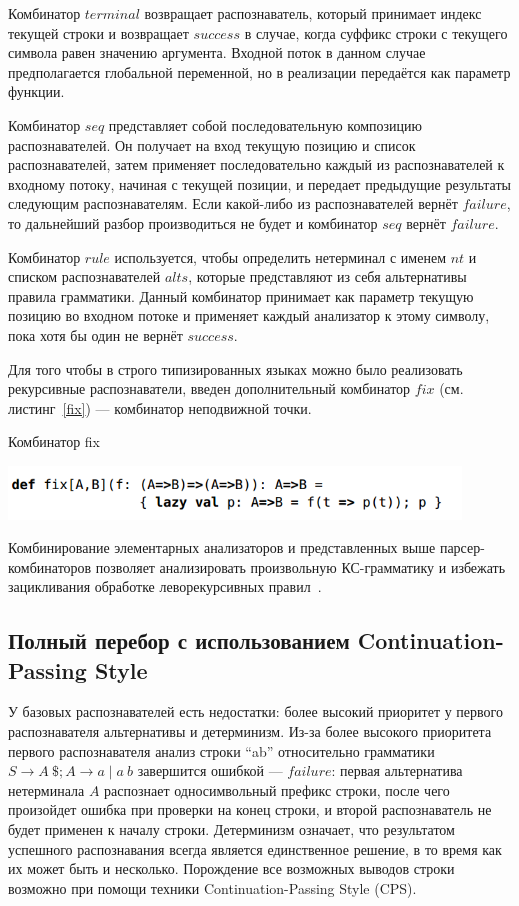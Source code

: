 Комбинатор $terminal$ возвращает распознаватель, который принимает индекс текущей строки и возвращает $success$ в случае, когда суффикс строки с текущего символа равен значению аргумента. Входной поток в данном случае предполагается глобальной переменной, но в реализации передаётся как параметр функции. 

Комбинатор $seq$ представляет собой последовательную композицию распознавателей. Он получает на вход текущую позицию и список распознавателей, затем применяет последовательно каждый из распознавателей к входному потоку, начиная с текущей позиции, и передает предыдущие результаты следующим распознавателям. Если какой-либо из распознавателей вернёт $failure$, то дальнейший разбор производиться не будет и комбинатор $seq$ вернёт $failure$. 

 Комбинатор $rule$ используется, чтобы определить нетерминал с именем $nt$ и списком распознавателей $alts$, которые представляют из себя альтернативы правила грамматики. Данный комбинатор принимает как параметр текущую позицию во входном потоке и применяет каждый анализатор к этому символу, пока хотя бы один не вернёт $success$. 

Для того чтобы в строго типизированных языках можно было реализовать рекурсивные распознаватели, введен дополнительный комбинатор $fix$ (см. листинг~\ref{fix}) --- комбинатор неподвижной точки.

\begin{listing}
\caption{Комбинатор fix}
\label{fix}
\centering
\includegraphics[width=0.9\textwidth]{Smolina/pics/fix.png}
\end{listing} 

Комбинирование элементарных анализаторов и представленных выше парсер-комбинаторов позволяет анализировать произвольную КС-грамматику и избежать зацикливания обработке леворекурсивных правил~\cite{GLL}.

\subsection{Полный перебор с использованием Continuation-Passing Style}
У базовых распознавателей есть недостатки: более высокий приоритет у первого распознавателя альтернативы и детерминизм. Из-за более высокого приоритета первого распознавателя анализ строки ``ab'' относительно грамматики $S \rightarrow A \ \$; A \rightarrow a \mid a \ b$ завершится ошибкой --- $failure$: первая альтернатива нетерминала $A$ распознает односимвольный префикс строки, после чего произойдет ошибка при проверки на конец строки, и второй распознаватель не будет применен к началу строки. Детерминизм означает, что результатом успешного распознавания всегда является единственное решение, в то время как их может быть и несколько. Порождение все возможных выводов строки возможно при помощи техники Continuation-Passing Style (CPS).


